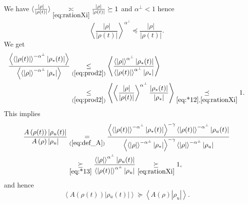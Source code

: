 \documentclass[AHL,Unicode,longabstracts,published]{cedram}
\newcommand*\eq[1]{\underset{(#1)}{=}}
\newcommand*\ineq[1]{\underset{(#1)}{\leq}}
\begin{document}
We have $\langle \frac{|\rho|}{|\rho(t)|}\rangle \underset{\eqref{eq:rationXi}}{\asymp}\frac{|\rho|}{|\rho(t)|}\succeq1$ and $\alpha^{\perp}<1$ hence
\begin{equation}\label{eq:*12}
\left\langle \frac{|\rho|}{|\rho(t)|}\right\rangle ^{\alpha^{\perp}}\preceq\frac{|\rho|}{|\rho(t)|}.
\end{equation}
We get
\begin{equation}\label{eq:*13}
\begin{split}
\frac{\left\langle \left\langle \left|\rho(t)\right|\right\rangle ^{-\alpha^{\perp}}\left|\rho_{*}(t)\right|\right\rangle }{\left\langle \left\langle \left|\rho\right|\right\rangle ^{-\alpha^{\perp}}\left|\rho_{*}\right|\right\rangle } &\ineq{\ref{eq:prod2}}\left\langle \frac{\left\langle \left|\rho\right|\right\rangle ^{\alpha^{\perp}}\left|\rho_{*}(t)\right|}{\left\langle \left|\rho(t)\right|\right\rangle ^{\alpha^{\perp}}\left|\rho_{*}\right|}\right\rangle\\ &\ineq{\ref{eq:prod2}}\left\langle \left\langle \frac{|\rho|}{|\rho(t)|}\right\rangle ^{\alpha^{\perp}}\frac{\left|\rho_{*}(t)\right|}{\left|\rho_{*}\right|}\right\rangle \underset{\eqref{eq:*12},\eqref{eq:rationXi}}{\preceq}1.
\end{split}
\end{equation}
This implies
\begin{align*}
\frac{A\left(\rho(t)\right)\left|\rho{}_{u}(t)\right|}{A\left(\rho\right)\left|\rho{}_{u}\right|}&\eq{\ref{eq:def_A}}\frac{\left\langle \left\langle \left|\rho(t)\right|\right\rangle ^{-\alpha^{\perp}}\left|\rho_{*}(t)\right|\right\rangle ^{-\gamma}\left\langle \left|\rho(t)\right|\right\rangle ^{-\alpha^{\perp}}\left|\rho{}_{u}(t)\right|}{\left\langle \left\langle \left|\rho\right|\right\rangle ^{-\alpha^{\perp}}\left|\rho_{*}\right|\right\rangle ^{-\gamma}\left\langle \left|\rho\right|\right\rangle ^{-\alpha^{\perp}}\left|\rho{}_{u}\right|}\\
&\underset{\eqref{eq:*13}}{\succeq}\frac{\left\langle \left|\rho\right|\right\rangle ^{\alpha^{\perp}}\left|\rho{}_{u}(t)\right|}{\left\langle \left|\rho(t)\right|\right\rangle ^{\alpha^{\perp}}\left|\rho{}_{u}\right|}\underset{\eqref{eq:rationXi}}{\succeq}1,
\end{align*}
and hence
\begin{equation}\label{eq:Au}
\left\langle A\left(\rho(t)\right)\left|\rho{}_{u}(t)\right|\right\rangle \succeq\left\langle A\left(\rho\right)\left|\rho_{u}\right|\right\rangle.
\end{equation}
\end{document}
